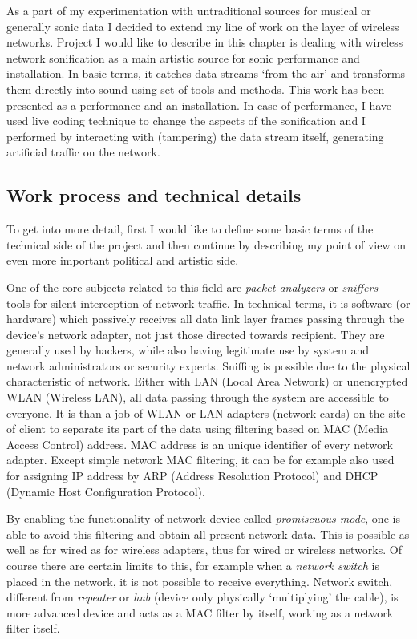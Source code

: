 \documentclass[12pt,a4paper,oneside]{report}
\begin{document}
As a part of my experimentation with untraditional sources for musical or generally sonic data I decided to extend my line of work on the layer of wireless networks. Project I would like to describe in this chapter is dealing with wireless network sonification as a main artistic source for sonic performance and installation. In basic terms, it catches data streams `from the air' and transforms them directly into sound using set of tools and methods. This work has been presented as a performance and an installation. In case of performance, I have used live coding technique to change the aspects of the sonification and I performed by interacting with (tampering) the data stream itself, generating artificial traffic on the network.

\subsection{Work process and technical details}

To get into more detail, first I would like to define some basic terms of the technical side of the project and then continue by describing my point of view on even more important political and artistic side.

One of the core subjects related to this field are \emph{packet analyzers} or \emph{sniffers} – tools for silent interception of network traffic. In technical terms, it is software (or hardware) which passively receives all data link layer frames passing through the device’s network adapter, not just those directed towards recipient. They are generally used by hackers, while also having legitimate use by system and network administrators or security experts. Sniffing is possible due to the physical characteristic of network. Either with LAN (Local Area Network) or unencrypted WLAN (Wireless LAN), all data passing through the system are accessible to everyone. It is than a job of WLAN or LAN adapters (network cards) on the site of client to separate its part of the data using filtering based on MAC (Media Access Control) address. MAC address is an unique identifier of every network adapter. Except simple network MAC filtering, it can be for example also used for assigning IP address by ARP (Address Resolution Protocol) and DHCP (Dynamic Host Configuration Protocol).

By enabling the functionality of network device called \emph{promiscuous mode}, one is able to avoid this filtering and obtain all present network data. This is possible as well as for wired as for wireless adapters, thus for wired or wireless networks. Of course there are certain limits to this, for example when a \emph{network switch} is placed in the network, it is not possible to receive everything. Network switch, different from \emph{repeater} or \emph{hub} (device only physically `multiplying' the cable), is more advanced device and acts as a MAC filter by itself, working as a network filter itself. \cite{Pallavi2012}
\end{document}
